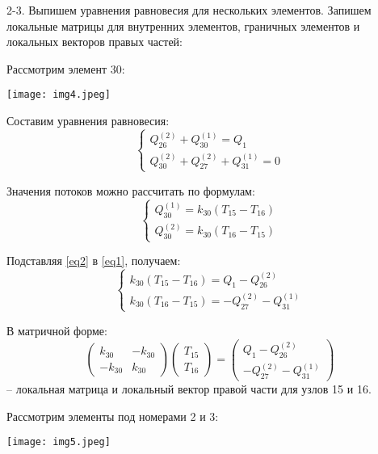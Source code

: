 \documentclass[a4paper, 12pt]{article}
\begin{document}
2-3. Выпишем уравнения равновесия для нескольких элементов. Запишем локальные матрицы для внутренних элементов, граничных элементов и локальных векторов правых частей:

Рассмотрим элемент 30: 
\begin{center}
\texttt{[image: img4.jpeg]}
\end{center}

Составим уравнения равновесия:
\begin{equation} \label{eq1}
\begin{cases}
Q_{26}^{(2)} + Q_{30}^{(1)} = Q_1\\
Q_{30}^{(2)} + Q_{27}^{(2)} + Q_{31}^{(1)} = 0
\end{cases}
\end{equation} 

Значения потоков можно рассчитать по формулам:
\begin{equation} \label{eq2}
\begin{cases}
Q_{30}^{(1)} = k_{30} (T_{15} - T_{16})\\
Q_{30}^{(2)} =  k_{30} (T_{16} - T_{15})
\end{cases}
\end{equation} 

Подставляя \eqref{eq2} в \eqref{eq1}, получаем:
\begin{equation} \label{eq3}
\begin{cases}
k_{30} (T_{15} - T_{16}) = Q_1 - Q_{26}^{(2)}\\
 k_{30} (T_{16} - T_{15})  = -Q_{27}^{(2)} - Q_{31}^{(1)}
\end{cases}
\end{equation} 

В матричной форме:
\begin{equation} \label{eq4}
\begin{pmatrix}
k_{30} & -k_{30}\\
-k_{30} & k_{30}
\end{pmatrix}
\begin{pmatrix}
T_{15}\\
T_{16}
\end{pmatrix} =
\begin{pmatrix}
Q_1 - Q_{26}^{(2)}\\
-Q_{27}^{(2)} - Q_{31}^{(1)}
\end{pmatrix}
\end{equation} 
-- локальная матрица и локальный вектор правой части для узлов 15 и 16.

Рассмотрим элементы под номерами 2 и 3:
\begin{center}
\texttt{[image: img5.jpeg]}
\end{center}
\end{document}
